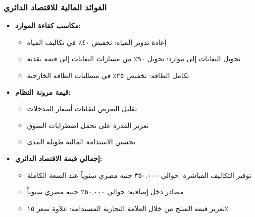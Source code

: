 \subsubsection{الفوائد المالية للاقتصاد الدائري}
\begin{itemize}
    \item \textbf{مكاسب كفاءة الموارد:}
    \begin{itemize}
        \item إعادة تدوير المياه: تخفيض ٤٠٪ في تكاليف المياه
        \item تحويل النفايات إلى موارد: تحويل ٩٠٪ من مسارات النفايات إلى قيمة نقدية
        \item تكامل الطاقة: تخفيض ٢٥٪ في متطلبات الطاقة الخارجية
    \end{itemize}
    
    \item \textbf{قيمة مرونة النظام:}
    \begin{itemize}
        \item تقليل التعرض لتقلبات أسعار المدخلات
        \item تعزيز القدرة على تحمل اضطرابات السوق
        \item تحسين الاستدامة المالية طويلة المدى
    \end{itemize}
    
    \item \textbf{إجمالي قيمة الاقتصاد الدائري:}
    \begin{itemize}
        \item توفير التكاليف المباشرة: حوالي ٣٥٠,٠٠٠ جنيه مصري سنوياً عند السعة الكاملة
        \item مصادر دخل إضافية: حوالي ٢٥٠,٠٠٠ جنيه مصري سنوياً
        \item تعزيز قيمة المنتج من خلال العلامة التجارية المستدامة: علاوة سعر ١٥٪
    \end{itemize}
\end{itemize}
